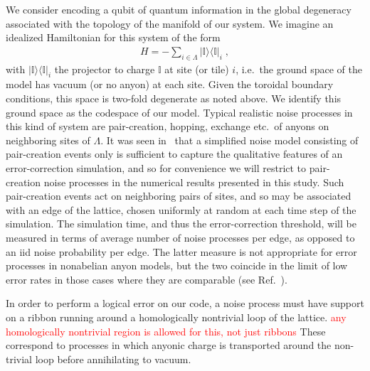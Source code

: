 \documentclass[aps, prl, letterpaper, twocolumn, superscriptaddress, notitlepage, 10pt]{revtex4}
\newcommand{\vac}{\mathbb{I}}
\newcommand{\ket}[1]{|{#1}\rangle}
\newcommand{\bra}[1]{\langle{#1}|}
\newcommand{\ketbra}[2]{\ket{#1}\!\bra{#2}}
\newcommand{\proj}[1]{\ketbra{#1}{#1}}
\newcommand{\dude}[1]{\textcolor{red}{#1}}
\begin{document}
We consider encoding a qubit of quantum information in the global degeneracy associated 
with the topology of the manifold of our system. We imagine an idealized Hamiltonian for this 
system of the form
\begin{align}
	H=-\sum_{i\in \Lambda}\proj{\vac}_i\;,\label{e:hamiltonian}
\end{align}
with $\proj{\vac}_i$ the projector to charge $\vac$ at site (or tile) $i$, i.e.~the ground 
space of the model has vacuum (or no anyon) at each site. Given the toroidal boundary 
conditions, this space is two-fold degenerate as noted above. We identify this ground space 
as the codespace of our model. Typical realistic noise processes in this kind of system are 
pair-creation, hopping, exchange etc.~of anyons on neighboring sites of $\Lambda$. It was 
seen in~\cite{Brell2013} that a simplified noise model consisting of pair-creation events only 
is sufficient to capture the qualitative features of an error-correction simulation, and so for convenience we 
will restrict to pair-creation noise processes in the numerical results presented in this study. 
Such pair-creation events act on neighboring pairs of sites,
and so may be associated with an edge of the lattice, chosen 
uniformly at random at each time step of the simulation. The simulation time, and thus the 
error-correction threshold, will be measured in terms of average number of noise processes 
per edge, as opposed to an iid noise probability per edge. The latter measure is not 
appropriate for error processes in nonabelian anyon models, but the two coincide in the limit 
of low error rates in those cases where they are comparable (see Ref.~\cite{Brell2013}).

In order to perform a logical error on our code, a noise process must have support on a 
ribbon running around a homologically nontrivial loop of the lattice.
\dude{any homologically nontrivial region is allowed for this, not just ribbons}
These correspond to 
processes in which anyonic charge is transported around the non-trivial loop before 
annihilating to vacuum.
\end{document}
